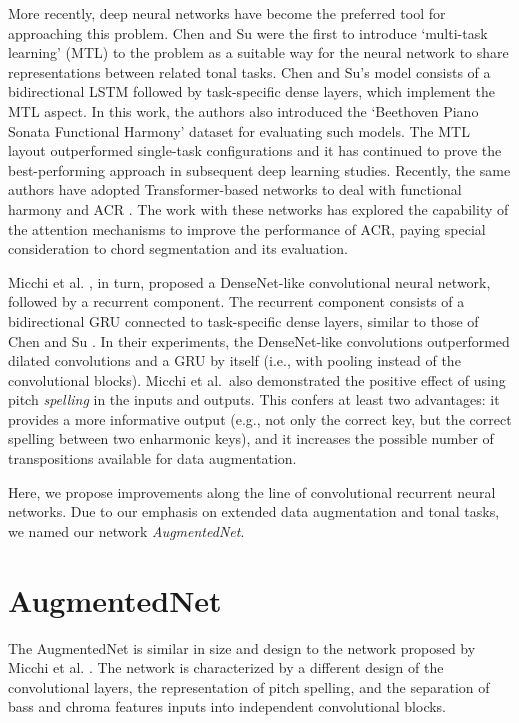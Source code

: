 \documentclass{article}
\newcommand{\guide}[1]{}
\begin{document}
\guide{Chen and Su (2018).}
More recently, deep neural networks have become the preferred tool for approaching this problem.
Chen and Su \cite{chen_functional_2018} were the first to introduce `multi-task learning' (MTL) \cite{ruder_overview_2017} to the problem as a suitable way for the neural network to share representations between related tonal tasks. 
Chen and Su's model consists of a bidirectional LSTM \cite{hochreiter_long_1997} followed by task-specific dense layers, which implement the MTL aspect.
In this work, the authors also introduced the `Beethoven Piano Sonata Functional Harmony' dataset for evaluating such models. 
The MTL layout outperformed single-task configurations and it has continued to prove the best-performing approach in subsequent deep learning studies. 
Recently, the same authors have adopted Transformer-based networks to deal with functional harmony and ACR \cite{chen_harmony_2019, chen_attend_2021}. 
The work with these networks has explored the capability of the attention mechanisms to improve the performance of ACR, paying special consideration to chord segmentation and its evaluation. 

\guide{Micchi et al (2020).}
Micchi et al. \cite{micchi_not_2020}, in turn, proposed a DenseNet-like \cite{huang_densely_2017} convolutional neural network, followed by a recurrent component.
The recurrent component consists of a bidirectional GRU \cite{cho_learning_2014} connected to task-specific dense layers, similar to those of Chen and Su \cite{chen_functional_2018}.
In their experiments, the DenseNet-like convolutions outperformed dilated convolutions and a GRU by itself (i.e., with pooling instead of the convolutional blocks).
Micchi et al.~also demonstrated the positive effect of using pitch \textit{spelling} in the inputs and outputs.
This confers at least two advantages: it provides a more informative output (e.g., not only the correct key, but the correct spelling between two enharmonic keys), and it increases the possible number of transpositions available for data augmentation.

\guide{Ours.}
Here, we propose improvements along the line of convolutional recurrent neural networks. Due to our emphasis on extended data augmentation and tonal tasks, we named our network \emph{AugmentedNet}.
 
\section{AugmentedNet}

The AugmentedNet is similar in size and design to the network proposed by Micchi et al. \cite{micchi_not_2020}. The network is characterized by a different design of the convolutional layers, the representation of pitch spelling, and the separation of bass and chroma features inputs into independent convolutional blocks.
\end{document}
